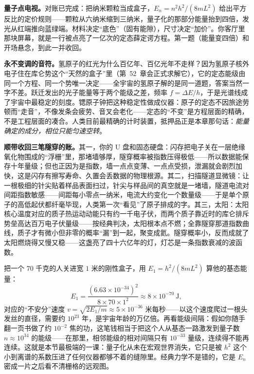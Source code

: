 \textbf{量子点电视。}对账已完成：把纳米颗粒当成盒子，\(E_{n}=n^{2}h^{2}/(8mL^{2})\) 给出平方反比的定价规则——颗粒从六纳米缩到三纳米，量子化的那部分能量抬到四倍，发光从红端推向蓝绿端。材料决定“底色”（固有能隙），尺寸决定“加价”。你客厅里那块屏幕，就是一行被点亮了一亿次的定态薛定谔方程。第一题（能量变四倍）和开场悬念，到此一并收回。

\textbf{永不变调的音符。}氢原子的红光为什么百亿年、百亿光年不走样？因为氢原子核外电子住在库仑势这个“天然的盒子”里（第~52~章会正式求解它），它的定态能级由同一个方程、同一个势唯一决定——全宇宙的氢原子解的是同一道题，答案当然一字不差。跃迁发出的光子能量等于两个能级之差，频率 \(f=\Delta E/h\)，于是光谱线成了宇宙中最稳定的刻度。锶原子钟把这种稳定性做成仪器：原子的定态不因旅途劳顿而“走音”，不像发条会疲劳、音叉会老化——定态的“不变”是方程层面的精确，不是工程层面的凑合。人类目前最精确的计时装置，抵押品正是本章那句话：\emph{能量确定的成分，相位只能匀速空转}。

\textbf{顺带收回三笔隧穿的账。}其一，你的 U 盘和固态硬盘：闪存把电子关在一层绝缘氧化物围成的“浮栅”里，那堵墙够厚，隧穿概率被指数压得极低——所以数据能保存十年量级；但也正因为是指数，墙一点点变薄、一点点受损，泄漏就会剧烈加快，这是闪存有擦写寿命、久置会丢数据的物理根源。其二，扫描隧道显微镜：让一根极细的针尖贴着样品表面扫过，针尖与样品间的真空就是一堵墙，隧道电流对间距指数敏感——间距每小零点一纳米，电流大约变化一个数量级——于是单个原子的高低起伏都纤毫毕现，人类第一次“看见”了原子排成的字。其三，太阳：太阳核心温度对应的质子热运动动能只有约一千电子伏，而两个质子靠近时的库仑排斥势垒高达百万电子伏量级——按经典判决，太阳根本点不燃；全靠隧穿那道指数曲线，质子才有微小但非零的概率“漏”到一起，聚变成氦。隧穿概率小，反而成就了太阳燃烧得又慢又稳——这盏亮了四十六亿年的灯，灯芯是一条指数衰减的波函数。


\begin{thought}[把人关进无限深势阱]
把一个 \(70\) 千克的人关进宽 \(1\) 米的刚性盒子，用 \(E_{1}=h^{2}/(8mL^{2})\) 算他的基态能量：
\[
  E_{1}=\frac{(6.63\times10^{-34})^{2}}{8\times70\times1^{2}}\approx8\times10^{-70}\ \text{J},
\]
对应的“不安分”速度 \(v=\sqrt{2E_{1}/m}\approx5\times10^{-36}\) 米每秒——以这个速度爬过一根头发丝的直径，需要约 \(10^{23}\) 年，是宇宙年龄的万亿倍。再看能级间隔：假如你随手翻一页书做了约 \(10^{-2}\) 焦的功，这笔钱相当于把这个人从基态一路激发到量子数 \(n\approx10^{34}\) 的能级——在那里，相邻能级的相对间隔只有 \(10^{-33}\) 量级，连续得不能再连续。这就是本节最极端的一课：量子化从未在宏观世界消失，它只是被 \(h^{2}\) 这个小到离谱的系数压进了任何仪器都够不着的缝隙里。经典力学不是错的，它是 \(E_{n}\) 密成一片之后看不清栅格的远观图。
\end{thought}

